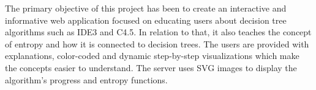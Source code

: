 
The primary objective of this project has been to create an interactive and informative web application focused on educating users about decision tree algorithms such as IDE3 and C4.5. In relation to that, it also teaches the concept of entropy and how it is connected to decision trees. The users are provided with explanations, color-coded and dynamic step-by-step visualizations which make the concepts easier to understand. The server uses SVG images to display the algorithm's progress and entropy functions. 